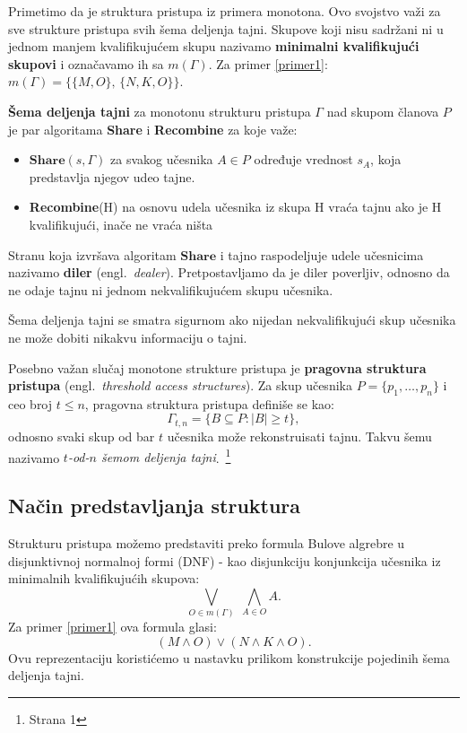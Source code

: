 Primetimo da je struktura pristupa iz primera monotona. Ovo svojstvo važi za sve strukture pristupa svih šema deljenja tajni.
Skupove koji nisu sadržani ni u jednom manjem kvalifikujućem skupu nazivamo \textbf{minimalni kvalifikujući skupovi} i označavamo ih sa $m(\Gamma)$.
Za primer \ref{primer1}: $m(\Gamma) = \{\{M,O\},\, \{N,K,O\}\}$.

\begin{definition} \textbf{Šema deljenja tajni} za monotonu strukturu pristupa $\Gamma$ nad skupom članova $P$ je par algoritama \textbf{Share} i \textbf{Recombine} za koje važe:
\begin{itemize}
\item $\textbf{Share}(s, \Gamma)$ za svakog učesnika $A \in P$ određuje vrednost $s_A$, koja predstavlja njegov udeo tajne.
\item \textbf{Recombine}(H) na osnovu udela učesnika iz skupa H vraća tajnu ako je H kvalifikujući, inače ne vraća ništa
\end{itemize}
\end{definition} 

Stranu koja izvršava algoritam $\textbf{Share}$ i tajno raspodeljuje udele učesnicima nazivamo \textbf{diler} (engl.\ \textit{dealer}). Pretpostavljamo da je diler poverljiv, odnosno da ne odaje tajnu ni jednom nekvalifikujućem skupu učesnika.


Šema deljenja tajni se smatra sigurnom ako nijedan nekvalifikujući skup učesnika ne može dobiti nikakvu informaciju o tajni.

Posebno važan slučaj monotone strukture pristupa je \textbf{pragovna struktura pristupa} (engl.\ \textit{threshold access structures}). Za skup učesnika $P = \{p_1, \ldots, p_n\}$ i ceo broj $t \leq n$, pragovna struktura pristupa definiše se kao:\[\Gamma_{t,n} = \{ B \subseteq P : |B| \geq t \},\]odnosno svaki skup od bar $t$ učesnika može rekonstruisati tajnu. Takvu šemu nazivamo \textit{$t$-od-$n$ šemom deljenja tajni}.~\cite{shamir1979how}\footnote{Strana 1}

\subsection{Način predstavljanja struktura}
Strukturu pristupa možemo predstaviti preko formula Bulove algrebre u disjunktivnoj normalnoj formi (DNF) - kao disjunkciju konjunkcija učesnika iz minimalnih kvalifikujućih skupova:
\[\bigvee_{O \in m(\Gamma)} \; \bigwedge_{A \in O} A.\]
Za primer \ref{primer1} ova formula glasi:
\[(M \wedge O) \vee (N \wedge K \wedge O).\]
Ovu reprezentaciju koristićemo u nastavku prilikom  konstrukcije pojedinih šema deljenja tajni.

